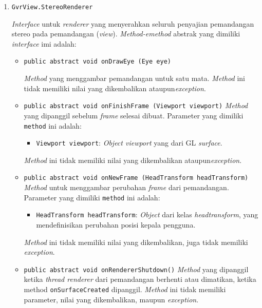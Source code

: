 	\begin{enumerate}
		\item \texttt{GvrView.StereoRenderer}
		
		\textit{Interface} untuk \textit{renderer} yang menyerahkan seluruh penyajian pemandangan stereo pada pemandangan (\textit{view}). \textit{Method-emethod} abstrak yang dimiliki \textit{interface} imi adalah:
			\begin{itemize}

				\item \texttt{public abstract void onDrawEye (Eye eye)}
				
\textit{Method} yang menggambar pemandangan untuk satu mata. \textit{Method} ini tidak memiliki nilai yang dikembalikan ataupun\textit{exception}. 

				\item \texttt{public abstract void onFinishFrame (Viewport viewport)}
\textit{Method} yang dipanggil sebelum \textit{frame} selesai dibuat. Parameter yang dimiliki \texttt{method} ini adalah:
				\begin{itemize}

					\item \texttt{Viewport viewport}: \textit{Object viewport} yang dari GL \textit{surface}.
				\end{itemize}
				
\textit{Method} ini tidak memiliki nilai yang dikembalikan ataupun\textit{exception}.
				
				\item \texttt{public abstract void onNewFrame (HeadTransform headTransform)}				
\textit{Method} untuk menggambar perubahan \textit{frame} dari pemandangan. Parameter yang dimiliki \texttt{method} ini adalah:

				\begin{itemize}
					\item \texttt{HeadTransform headTransform}: 						\textit{Object} dari kelas \textit{headtransform}, yang mendefinisikan perubahan posisi kepala pengguna.  
				\end{itemize}		
				\textit{Method} ini tidak memiliki nilai yang dikembalikan, juga tidak memiliki \textit{exception}. 						
				
				\item \texttt{public abstract void onRendererShutdown()}
\textit{Method} yang dipanggil ketika \textit{thread renderer} dari pemandangan berhenti atau dimatikan, ketika method \texttt{onSurfaceCreated} dipanggil. \textit{Method} ini tidak memiliki parameter, nilai yang dikembalikan, maupun \textit{exception}.
				

\end{itemize}
\end{enumerate}
